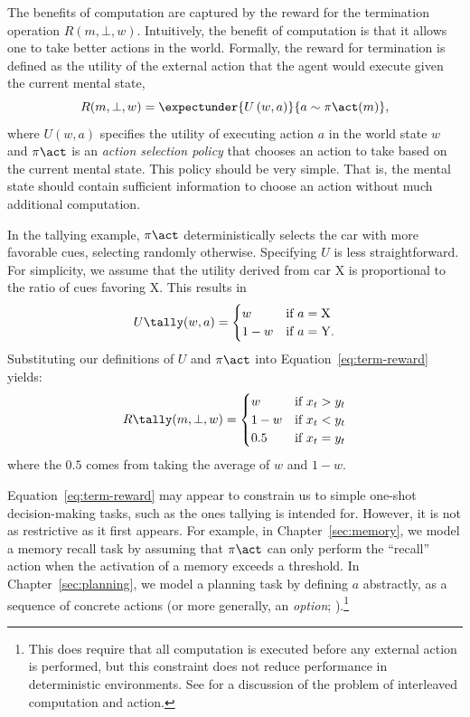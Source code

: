 The benefits of computation are captured by the reward for the termination operation $R(m, \bot, w)$. Intuitively, the benefit of computation is that it allows one to take better actions in the world. Formally, the reward for termination is defined as the utility of the external action that the agent would execute given the current mental state,
%
\begin{equation}\label{eq:term-reward}
  R(m, \bot, w) = \expectunder{U\left(w, a\right)}{a \sim \pi\act(m)},
\end{equation}
%
where $U(w, a)$ specifies the utility of executing action $a$ in the world state $w$ and $\pi\act$ is an \emph{action selection policy} that chooses an action to take based on the current mental state. This policy should be very simple. That is, the mental state should contain sufficient information to choose an action without much additional computation.

In the tallying example, $\pi\act$ deterministically selects the car with more favorable cues, selecting randomly otherwise. Specifying $U$ is less straightforward. For simplicity, we assume that the utility derived from car X is proportional to the ratio of cues favoring X. This results in
\begin{equation}
  U\tally(w, a) = \begin{cases}
    w &\text{if } a = \mathrm{X} \\
    1-w &\text{if } a = \mathrm{Y}.
  \end{cases}
\end{equation}
Substituting our definitions of $U$ and $\pi\act$ into Equation~\ref{eq:term-reward} yields:
\begin{equation}
  R\tally(m, \bot, w) = \begin{cases}
    w &\text{if } x_t > y_t \\
    1-w &\text{if } x_t < y_t \\
    0.5 &\text{if } x_t = y_t
  \end{cases}
\end{equation}
where the $0.5$ comes from taking the average of $w$ and $1 - w$.

Equation~\ref{eq:term-reward} may appear to constrain us to simple one-shot decision-making tasks, such as the ones tallying is intended for. However, it is not as restrictive as it first appears. For example, in Chapter~\ref{sec:memory}, we model a memory recall task by assuming that $\pi\act$ can only perform the ``recall'' action when the activation of a memory exceeds a threshold. In Chapter~\ref{sec:planning}, we model a planning task by defining $a$ abstractly, as a sequence of concrete actions (or more generally, an \emph{option}; \citealp{sutton1999mdps}).\footnote{
  This does require that all computation is executed before any external action is performed, but this constraint does not reduce performance in deterministic environments. See  for a discussion of the problem of interleaved computation and action.
} 

